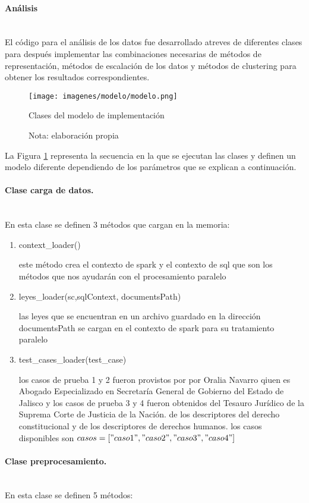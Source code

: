 \documentclass[12pt]{article}
\newcommand{\subsubsubsection}[1]{\paragraph{#1}\mbox{}\\}
\begin{document}
			\subsubsubsection{Análisis}
			El código para el análisis de los datos fue desarrollado atreves de diferentes clases para después implementar las combinaciones necesarias  de métodos de representación, métodos de escalación de los datos y métodos de clustering para obtener los resultados correspondientes.
						
			\begin{figure}[h]
				\texttt{[image: imagenes/modelo/modelo.png]}
				\centering
				\caption{Clases del modelo de implementación}
				\caption*{\small Nota:  elaboración propia}
				\label{fig:modelo_clases}
			\end{figure}			
						
			La Figura \ref{fig:modelo_clases} representa la secuencia en la que se ejecutan las clases y definen un modelo diferente dependiendo de los parámetros que se explican a continuación.
			
			\subsubsubsection{Clase carga de datos.}
			En esta clase se definen 3 métodos que cargan en la memoria:
						
			\begin{enumerate}
			\item context\_loader()
			
			este método crea el contexto de spark y el contexto de sql que son los métodos que nos ayudarán con el procesamiento paralelo
			
			\item leyes\_loader(sc,sqlContext, documentsPath)
			
			las leyes que se encuentran en un archivo guardado en la dirección documentsPath se cargan en el contexto de spark para su tratamiento paralelo
			
			\item test\_cases\_loader(test\_case)
			
			los casos de prueba 1 y 2 fueron provistos por por Oralia Navarro qiuen es Abogado Especializado en Secretaría General de Gobierno del Estado de Jalisco y los casos de prueba 3 y 4 fueron obtenidos del Tesauro Jurídico de la Suprema Corte de Justicia de la Nación.\cite{MedellinLuque2014} de los descriptores del derecho constitucional y de los descriptores de derechos humanos. los casos disponibles son $casos = ["caso1", "caso2", "caso3", "caso4"]$
			
			\end{enumerate}
			
			
			\subsubsubsection{Clase preprocesamiento.}
			En esta clase se definen 5 métodos:
\end{document}
